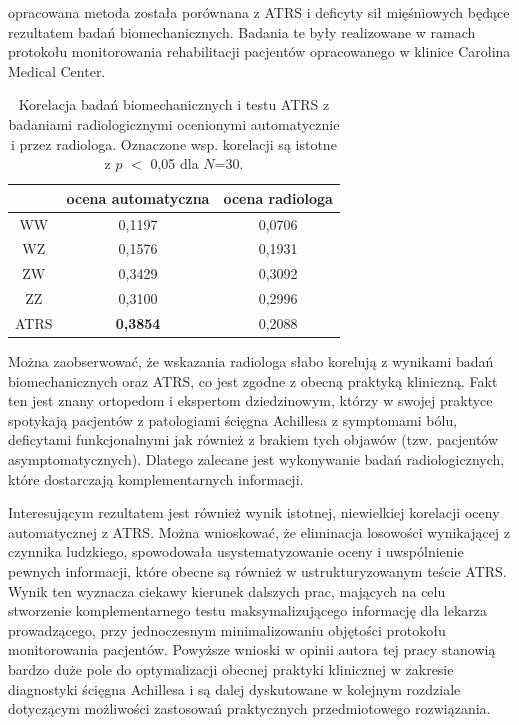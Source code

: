 opracowana metoda została porównana z ATRS i deficyty sił mięśniowych będące rezultatem badań biomechanicznych. Badania te były realizowane w ramach protokołu monitorowania rehabilitacji pacjentów opracowanego w klinice Carolina Medical Center.

\begin{table}[h]
	\centering
	\setlength{\tabcolsep}{3pt}
	\setlength\extrarowheight{2pt}
	\caption{Korelacja badań biomechanicznych i testu ATRS z badaniami radiologicznymi ocenionymi automatycznie i przez radiologa. Oznaczone wsp. korelacji są istotne z $p$ $<$ 0,05 dla $N$=30.}
	\label{tab:bioATRSvspredGT}
	\begin{tabular}{c|c|c}
		&ocena automatyczna&ocena radiologa \\
		\hline \hline
		WW&0,1197&0,0706\\
		\hline
		WZ&0,1576&0,1931\\
		\hline
		ZW&0,3429&0,3092\\
		\hline
		ZZ&0,3100&0,2996\\
		\hline
		ATRS&\textbf{0,3854}&0,2088\\
		
		
	\end{tabular}
\end{table}

Można zaobserwować, że wskazania radiologa słabo korelują z wynikami badań biomechanicznych oraz ATRS, co jest zgodne z obecną praktyką kliniczną. Fakt ten jest znany ortopedom i ekspertom dziedzinowym, którzy w swojej praktyce spotykają pacjentów z patologiami ścięgna Achillesa z symptomami bólu, deficytami funkcjonalnymi jak również z brakiem tych objawów (tzw. pacjentów asymptomatycznych). Dlatego zalecane jest wykonywanie badań radiologicznych, które dostarczają komplementarnych informacji. 

Interesującym rezultatem jest również wynik istotnej, niewielkiej korelacji oceny automatycznej z ATRS. Można wnioskować, że eliminacja losowości wynikającej \linebreak z czynnika ludzkiego, spowodowała usystematyzowanie oceny i uwspólnienie pewnych informacji, które obecne są również w ustrukturyzowanym teście ATRS. Wynik ten wyznacza ciekawy kierunek dalszych prac, mających na celu stworzenie komplementarnego testu maksymalizującego informację dla lekarza prowadzącego, przy jednoczesnym minimalizowaniu objętości protokołu monitorowania pacjentów. Powyższe wnioski w opinii autora tej pracy stanowią bardzo duże pole do optymalizacji obecnej praktyki klinicznej w zakresie diagnostyki ścięgna Achillesa i są dalej dyskutowane w kolejnym rozdziale dotyczącym możliwości zastosowań praktycznych przedmiotowego rozwiązania.


